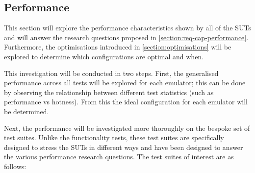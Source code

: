 \subsection{Performance}

This section will explore the performance characteristics shown by all of the SUTs and will answer the research questions proposed in \autoref{section:req-cap-performance}. Furthermore, the optimisations introduced in \autoref{section:optimisations} will be explored to determine which configurations are optimal and when.

This investigation will be conducted in two steps. First, the generalised performance across all tests will be explored for each emulator; this can be done by observing the relationship between different test statistics (such as performance vs hotness). From this the ideal configuration for each emulator will be determined.

Next, the performance will be investigated more thoroughly on the bespoke set of test suites. Unlike the functionality tests, these test suites are specifically designed to stress the SUTs in different ways and have been designed to answer the various performance research questions. The test suites of interest are as follows:

